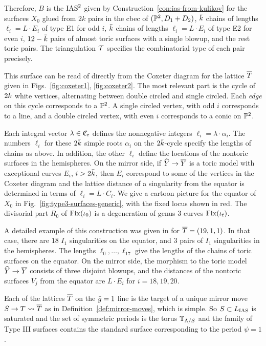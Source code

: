 \documentclass{amsart}
\begin{document}
Therefore, $B$ is the $\operatorname{IAS}^2$ given by
Construction~\ref{con:ias-from-kulikov} for the surfaces $X_0$ glued
from $2k$ pairs in the cbec of $({\mathbb P}^2,D_1+D_2)$, $\bar k$ chains of
lengths $\ell_i=L\cdot E_i$ of type E1 for odd
$i$, $\bar k$ chains of lengths $\ell_i=L\cdot E_i$ of type E2 for even $i$,
$12-\bar k$ pairs of almost toric surfaces with a single blowup, and the
rest toric pairs. The triangulation ${\mathcal T}$ specifies the combinatorial type of
each pair precisely.

\medskip

This surface can be read of directly from the Coxeter diagram for the
lattice ${\overline T}$ given in Figs.~\ref{fig:coxeter1},
\ref{fig:coxeter2}. The most relevant part is the cycle of $2\bar k$ white
vertices, alternating between double circled and single circled. Each
\emph{edge} on this cycle corresponds to a ${\mathbb P}^2$. A single circled vertex,
with odd $i$ corresponds to a line, and a double circled vertex, with
even $i$ corresponds to a conic on ${\mathbb P}^2$.

Each integral vector $\lambda\in{\mathfrak C}_{\rm r}$ defines the nonnegative
integers $\ell_i=\lambda\cdot\alpha_i$. The numbers $\ell_i$ for these
$2\bar k$ simple roots $\alpha_i$ on the $2\bar k$-cycle specify the lengths of
chains as above. In addition, the other $\ell_i$ define the locations
of the nontoric surfaces in the hemispheres. On the mirror side, if
${\widehat Y}\to{\overline Y}$ is a toric model with exceptional curves $E_i$, $i>2\bar k$, then
$E_i$ correspond to some of the vertices in the Coxeter diagram and
the lattice distance of a singularity from the equator is determined
in terms of $\ell_i=L\cdot C_i$. 
We give a cartoon picture for the equator of $X_0$ in Fig.~\ref{fig:type3-surfaces-generic},
with the fixed locus shown in red. The divisorial part $R_0$
of ${\rm Fix}(\iota_0)$ is a degeneration of genus $3$ curves
${\rm Fix}(\iota_t)$. 
\smallskip

A detailed example of this construction was given in
\cite{alexeev2019stable-pair} for ${\overline T}=(19,1,1)$. In that case, there
are $18$ $I_1$ singularities on the equator, and $3$ pairs of
$I_1$ singularities in the hemispheres. The lengths
$\ell_0, \dotsc, \ell_{17}$ give the lengths of the chains of toric
surfaces on the equator. On the mirror side, the morphism to the toric
model ${\widehat Y}\to{\overline Y}$ consists of three disjoint blowups, and the
distances of the nontoric surfaces $V_j$ from the equator are $L\cdot E_i$
for $i=18, 19, 20$.

\medskip

Each of the lattices ${\overline T}$ on the $\bar g=1$ line is the target of a
unique mirror move $S\to T\leadsto {\overline T}$ as in
Definition~\ref{def:mirror-moves}, which is simple. So $S\subset L_{\rm IAS}$
is saturated and the set of symmetric periods is the torus
${\mathbb T}_{\Lambda/S}$ and the family of Type III surfaces contains
the standard surface corresponding to the period $\psi=1$.
\end{document}
